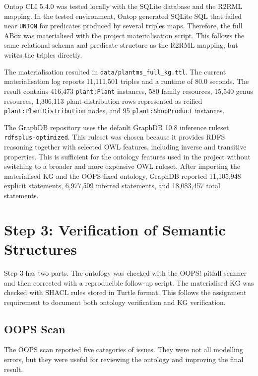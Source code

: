 \documentclass[11pt,a4paper]{article}
\newcommand{\artifact}[1]{\texttt{#1}}
\begin{document}
Ontop CLI 5.4.0 was tested locally with the SQLite database and the R2RML
mapping. In the tested environment, Ontop generated SQLite SQL that failed near
\artifact{UNION} for predicates produced by several triples maps. Therefore, the
full ABox was materialised with the project materialisation script. This follows
the same relational schema and predicate structure as the R2RML mapping, but
writes the triples directly.

The materialisation resulted in \artifact{data/plantms\_full\_kg.ttl}. The
current materialisation log reports 11,111,501 triples and a runtime of
80.0 seconds. The result contains 416,473 \artifact{plant:Plant} instances,
580 family resources, 15,540 genus resources, 1,306,113 plant-distribution rows
represented as reified \artifact{plant:PlantDistribution} nodes, and
95 \artifact{plant:ShopProduct} instances.

The GraphDB repository uses the default GraphDB 10.8 inference ruleset
\artifact{rdfsplus-optimized}. This ruleset was chosen because it provides RDFS
reasoning together with selected OWL features, including inverse and transitive
properties. This is sufficient for the ontology features used in the project
without switching to a broader and more expensive OWL ruleset. After importing
the materialised KG and the OOPS-fixed ontology, GraphDB reported 11,105,948
explicit statements, 6,977,509 inferred statements, and 18,083,457 total
statements.

\section{Step 3: Verification of Semantic Structures}

Step 3 has two parts. The ontology was checked with the OOPS! pitfall scanner
and then corrected with a reproducible follow-up script. The materialised KG was
checked with SHACL rules stored in Turtle format. This follows the assignment
requirement to document both ontology verification and KG verification.

\subsection{OOPS Scan}

The OOPS scan reported five categories of issues. They were not all modelling
errors, but they were useful for reviewing the ontology and improving the final
result.
\end{document}
